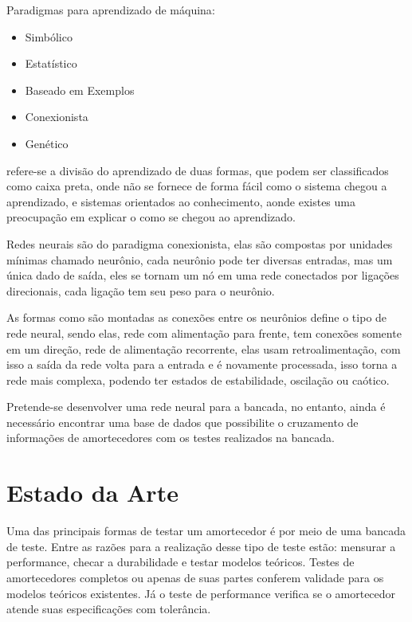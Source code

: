 		Paradigmas para aprendizado de máquina\cite{rezende_sistemas_2003}:

		\begin{itemize}
		\item Simbólico
		\item Estatístico 
		\item Baseado em Exemplos
		\item Conexionista
		\item Genético
		\end{itemize}


		\cite{michalski_machine_1998} refere-se a divisão do aprendizado de duas formas, que podem ser classificados como caixa preta, onde não se fornece de forma fácil como o sistema chegou a aprendizado, e sistemas orientados ao conhecimento, aonde existes uma preocupação em explicar o como se chegou ao aprendizado.


		Redes neurais são do paradigma conexionista, elas são compostas por unidades mínimas chamado neurônio, cada neurônio pode ter diversas entradas, mas um única dado de saída, eles se tornam um nó em uma rede conectados por ligações direcionais, cada ligação tem seu peso para o neurônio\cite{russell_inteligencia_2013}.
			

		As formas como são montadas as conexões entre os neurônios define o tipo de rede neural, sendo elas, rede com alimentação para frente, tem conexões somente em um direção, rede de alimentação recorrente, elas usam retroalimentação, com isso a saída da rede volta para a entrada e é novamente processada, isso torna a rede mais complexa, podendo ter estados de estabilidade, oscilação ou caótico\cite{russell_inteligencia_2013}.

		Pretende-se desenvolver uma rede neural para a bancada, no entanto, ainda é necessário encontrar uma base de dados que possibilite o cruzamento de informações de amortecedores com os testes realizados na bancada. 


	\newpage
	\section{Estado da Arte}
	
		Uma das principais formas de testar um amortecedor é por meio de uma bancada de teste. Entre as razões para a realização desse tipo de teste estão: mensurar a performance, checar a durabilidade e testar modelos teóricos. Testes de amortecedores completos ou apenas de suas partes conferem validade para os modelos teóricos existentes. Já o teste de performance verifica se o amortecedor atende suas especificações com tolerância.  

